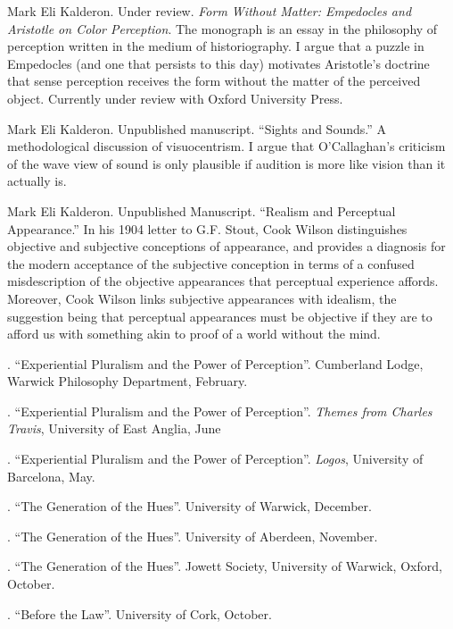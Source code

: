 \documentclass[11pt]{article}
\begin{document}
\ind Mark Eli Kalderon. Under review. \emph{Form Without Matter: Empedocles and Aristotle on Color Perception}. The monograph is an essay in the philosophy of perception written in the medium of historiography. I argue that a puzzle in Empedocles (and one that persists to this day) motivates Aristotle's doctrine that sense perception receives the form without the matter of the perceived object. Currently under review with Oxford University Press.

\ind Mark Eli Kalderon. Unpublished manuscript. ``Sights and Sounds.'' A methodological discussion of visuocentrism. I argue that O'Callaghan's criticism of the wave view of sound is only plausible if audition is more like vision than it actually is.

\ind Mark Eli Kalderon. Unpublished Manuscript. ``Realism and Perceptual Appearance.'' In his 1904 letter to G.F. Stout, Cook Wilson distinguishes objective and subjective conceptions of appearance, and provides a diagnosis for the modern acceptance of the subjective conception in terms of a confused misdescription of the objective appearances that perceptual experience affords. Moreover, Cook Wilson links subjective appearances with idealism, the suggestion being that perceptual appearances must be objective if they are to afford us with something akin to proof of a world without the mind.

 \bigskip

\medskip

. ``Experiential Pluralism and the Power of Perception''. Cumberland Lodge, Warwick Philosophy Department, February.

. ``Experiential Pluralism and the Power of Perception''. \emph{Themes from Charles Travis}, University of East Anglia, June

. ``Experiential Pluralism and the Power of Perception''. \emph{Logos}, University of Barcelona, May.

. ``The Generation of the Hues''. University of Warwick, December.

. ``The Generation of the Hues''. University of Aberdeen, November.

. ``The Generation of the Hues''. Jowett Society, University of Warwick, Oxford, October.

. ``Before the Law''. University of Cork, October.
\end{document}
